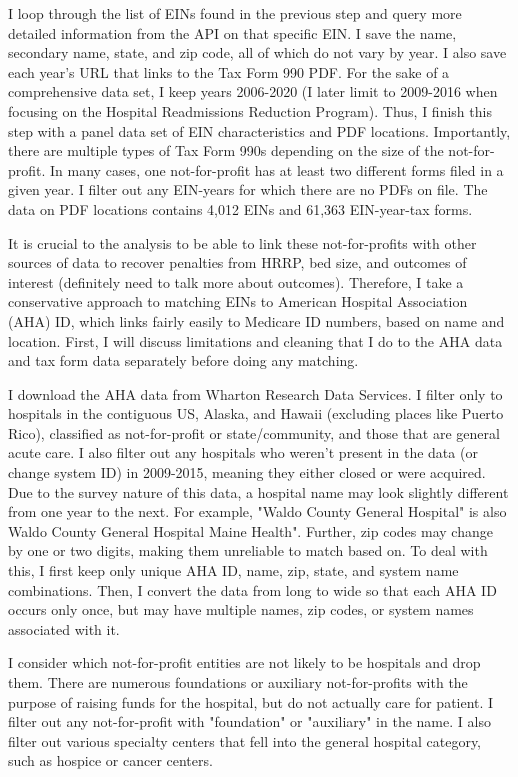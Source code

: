 \documentclass[12pt]{article}
\begin{document}
I loop through the list of EINs found in the previous step and query more detailed information from the API on that specific EIN. I save the name, secondary name, state, and zip code, all of which do not vary by year. I also save each year's URL that links to the Tax Form 990 PDF. For the sake of a comprehensive data set, I keep years 2006-2020 (I later limit to 2009-2016 when focusing on the Hospital Readmissions Reduction Program). Thus, I finish this step with a panel data set of EIN characteristics and PDF locations. Importantly, there are multiple types of Tax Form 990s depending on the size of the not-for-profit. In many cases, one not-for-profit has at least two different forms filed in a given year. I filter out any EIN-years for which there are no PDFs on file. The data on PDF locations contains 4,012 EINs and 61,363 EIN-year-tax forms.

It is crucial to the analysis to be able to link these not-for-profits with other sources of data to recover penalties from HRRP, bed size, and outcomes of interest (definitely need to talk more about outcomes). Therefore, I take a conservative approach to matching EINs to American Hospital Association (AHA) ID, which links fairly easily to Medicare ID numbers, based on name and location. First, I will discuss limitations and cleaning that I do to the AHA data and tax form data separately before doing any matching. 

I download the AHA data from Wharton Research Data Services. I filter only to hospitals in the contiguous US, Alaska, and Hawaii (excluding places like Puerto Rico), classified as not-for-profit or state/community, and those that are general acute care. I also filter out any hospitals who weren't present in the data (or change system ID) in 2009-2015, meaning they either closed or were acquired. Due to the survey nature of this data, a hospital name may look slightly different from one year to the next. For example, "Waldo County General Hospital" is also Waldo County General Hospital Maine Health". Further, zip codes may change by one or two digits, making them unreliable to match based on. To deal with this, I first keep only unique AHA ID, name, zip, state, and system name combinations. Then, I convert the data from long to wide so that each AHA ID occurs only once, but may have multiple names, zip codes, or system names associated with it.

I consider which not-for-profit entities are not likely to be hospitals and drop them. There are numerous foundations or auxiliary not-for-profits with the purpose of raising funds for the hospital, but do not actually care for patient. I filter out any not-for-profit with "foundation" or "auxiliary" in the name. I also filter out various specialty centers that fell into the general hospital category, such as hospice or cancer centers. 
\end{document}
